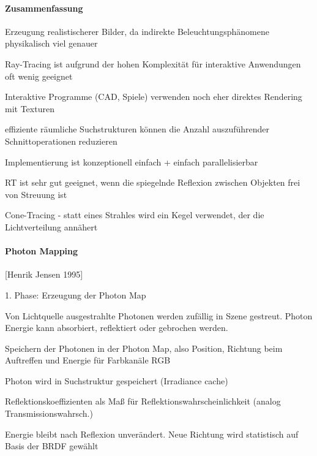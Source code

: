 \documentclass[landscape]{article}
\begin{document}
\begin{multicols}{3}
  \paragraph{Zusammenfassung}
  \begin{itemize*}
    \item Erzeugung realistischerer Bilder, da indirekte Beleuchtungsphänomene physikalisch viel genauer
    \item Ray-Tracing ist aufgrund der hohen Komplexität für interaktive Anwendungen oft wenig geeignet
    \item Interaktive Programme (CAD, Spiele) verwenden noch eher direktes Rendering mit Texturen
    \item effiziente räumliche Suchstrukturen können die Anzahl auszuführender Schnittoperationen reduzieren
    \item Implementierung ist konzeptionell einfach + einfach parallelisierbar
    \item RT ist sehr gut geeignet, wenn die spiegelnde Reflexion zwischen Objekten frei von Streuung ist
    \item Cone-Tracing - statt eines Strahles wird ein Kegel verwendet, der die Lichtverteilung annähert
  \end{itemize*}
  
  \paragraph{Photon Mapping} [Henrik Jensen 1995]
  
  1. Phase: Erzeugung der Photon Map
  \begin{itemize*}
    \item Von Lichtquelle ausgestrahlte Photonen werden zufällig in Szene gestreut. Photon Energie kann absorbiert, reflektiert oder gebrochen werden.
    \item Speichern der Photonen in der Photon Map, also Position, Richtung beim Auftreffen und Energie für Farbkanäle RGB
    \item Photon wird in Suchstruktur gespeichert (Irradiance cache)
    \item Reflektionskoeffizienten als Maß für Reflektionswahrscheinlichkeit (analog Transmissionswahrsch.)
    \item Energie bleibt nach Reflexion unverändert. Neue Richtung wird statistisch auf Basis der BRDF gewählt
  \end{itemize*}
  

\end{multicols}
\end{document}

